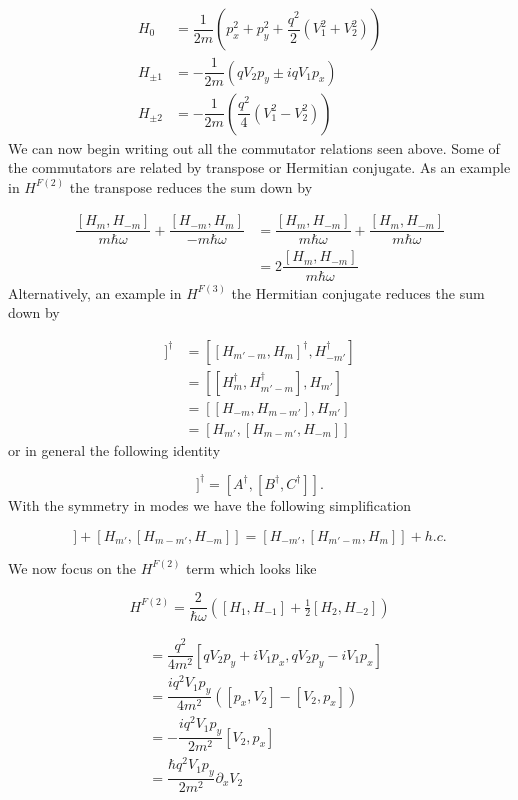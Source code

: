 \begin{align}
  H_0 &= \dfrac{1}{2m} \left(p_x^2 + p_y^2 + \dfrac{q^2}{2}(V_1^2+V_2^2) \right) \\
  H_{\pm1} &= -\dfrac{1}{2m} \left( qV_2 p_y \pm iqV_1p_x \right) \\
  H_{\pm2} &= -\dfrac{1}{2m} \left( \dfrac{q^2}{4} (V_1^2 - V_2^2) \right)
\end{align}
We can now begin writing out all the commutator relations seen above.
Some of the commutators are related by transpose or Hermitian conjugate.
As an example in $H^{F(2)}$ the transpose reduces the sum down by

\begin{align}
  \dfrac{[H_m,H_{-m}]}{m\hbar \omega} + \dfrac{[H_{-m}, H_m]}{-m\hbar\omega} &= \dfrac{[H_m,H_{-m}]}{m\hbar \omega} + \dfrac{[H_m, H_{-m}]}{m\hbar\omega} \\
  &= 2\dfrac{[H_m,H_{-m}]}{m\hbar \omega}
\end{align}
Alternatively, an example in $H^{F(3)}$ the Hermitian conjugate reduces the sum down by

\begin{align}
  [H_{-m'},[H_{m'-m},H_m]]^{\dagger} &= [[H_{m'-m},H_m]^{\dagger}, H_{-m'}^{\dagger}] \nonumber \\
  &= [ [H_m^{\dagger}, H_{m'-m}^{\dagger}], H_{m'}] \nonumber \\
  &= [ [H_{-m}, H_{m-m'}], H_{m'}] \nonumber \\
  &= [H_{m'}, [H_{m-m'}, H_{-m}]]
\end{align}
or in general the following identity

\begin{equation}
  [A,[B,C]]^{\dagger} = [A^{\dagger}, [B^{\dagger}, C^{\dagger}]].
\end{equation}
With the symmetry in modes we have the following simplification

\begin{equation}
  [H_{-m'},[H_{m'-m},H_m]] + [H_{m'},[H_{m-m'},H_{-m}]] = [H_{-m'},[H_{m'-m},H_m]] + h.c.
\end{equation}

We now focus on the $H^{F(2)}$ term which looks like

\begin{equation}
  H^{F(2)} = \dfrac{2}{\hbar\omega} \left( [H_1,H_{-1}] + \tfrac{1}{2} [H_2,H_{-2}] \right)
\end{equation}

\begin{align*}
  [H_1,H_{-1}] &= \dfrac{q^2}{4m^2} [qV_2 p_y + iV_1 p_x, qV_2 p_y - iV_1 p_x] \\
  &= \dfrac{iq^2 V_1 p_y}{4m^2} ([p_x,V_2] - [V_2,p_x]) \\
  &= -\dfrac{iq^2 V_1 p_y}{2m^2} [V_2,p_x] \\
  &= \dfrac{\hbar q^2 V_1 p_y}{2m^2} \partial_x V_2
\end{align*}

